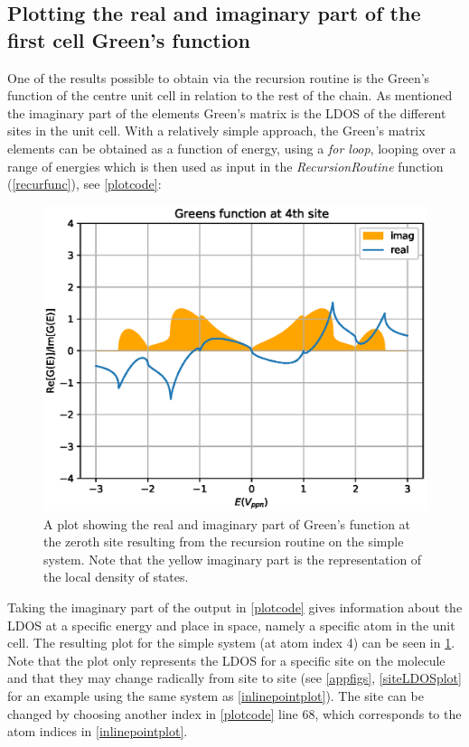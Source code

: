 \subsection{Plotting the real and imaginary part of the first cell Green's function}
One of the results possible to obtain via the recursion routine is the Green's function of the centre unit cell in relation to the rest of the chain. As mentioned the imaginary part of the elements Green's matrix is the LDOS of the different sites in the unit cell. With a relatively simple approach, the Green's matrix elements can be obtained as a function of energy, using a \textit{for loop}, looping over a range of energies which is then used as input in the \textit{RecursionRoutine} function (\cref{recurfunc}), see \cref{plotcode}:
\vspace{-1\baselineskip}
\vspace{\baselineskip}
\begin{figure}[ht]
	\includegraphics[width=.45\textwidth]{Figures/BetaimrealTE.eps}
	\caption{A plot showing the real and imaginary part of Green's function at the zeroth site resulting from the recursion routine on the simple system. Note that the yellow imaginary part is the representation of the local density of states.}
	\label{LDOSsimple}
\end{figure}
Taking the imaginary part of the output in \cref{plotcode} gives information about the LDOS at a specific energy and place in space, namely a specific atom in the unit cell. The resulting plot for the simple system (at atom index 4) can be seen in \cref{LDOSsimple}. Note that the plot only represents the LDOS for a specific site on the molecule and that they may change radically from site to site (see \cref{appfigs}, \cref{siteLDOSplot} for an example using the same system as \cref{inlinepointplot}). The site can be changed by choosing another index in \cref{plotcode} line 68, which corresponds to the atom indices in \cref{inlinepointplot}.

